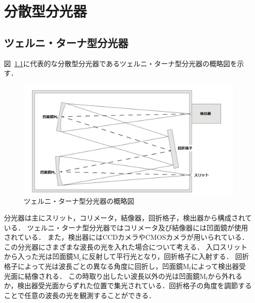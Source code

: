 \chapter{分散型分光器}







\section{ツェルニ・ターナ型分光器}
図\ \ref{fig:czerny_turner}に代表的な分散型分光器であるツェルニ・ターナ型分光器の概略図を示す．
\begin{figure}[htbp]
    \centering
    \includegraphics[scale=0.4]{figure/czerny_turner.pdf}
    \caption{ツェルニ・ターナ型分光器の概略図}
    \label{fig:czerny_turner}
\end{figure}
分光器は主にスリット，コリメータ，結像器，回折格子，検出器から構成されている．
ツェルニ・ターナ型分光器ではコリメータ及び結像器には凹面鏡が使用されている．
また，検出器にはCCDカメラやCMOSカメラが用いられている．
この分光器にさまざまな波長の光を入れた場合について考える．
入口スリットから入った光は凹面鏡$\mathrm{M_c}$に反射して平行光となり，回折格子に入射する．
回折格子によって光は波長ごとの異なる角度に回折し，凹面鏡$\mathrm{M_f}$によって検出器受光面に結像される．
この時取り出したい波長以外の光は凹面鏡$\mathrm{M_f}$から外れるか，検出器受光面からずれた位置で集光されている．回折格子の角度を調節することで任意の波長の光を観測することができる\cite{spectrometer}．


